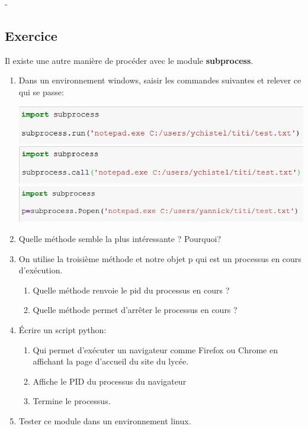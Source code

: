 \documentclass[11pt,a4paper]{article}
\newcounter{numexo}
\begin{document}
-
\addtocounter{numexo}{1}
\subsection*{\Large Exercice \thenumexo}
Il existe une autre manière de procéder avec le module \textbf{subprocess}.

\begin{enumerate}
\item Dans un environnement windows, saisir les commandes suivantes et relever ce qui se passe:
\begin{flushleft}
\includegraphics[scale=0.8]{img/subprocess1.jpg}
\includegraphics[scale=0.8]{img/subprocess2.jpg}
\includegraphics[scale=0.8]{img/subprocess3.jpg}
\end{flushleft}
\item Quelle méthode semble la plus intéressante ? Pourquoi?
\item On utilise la troisième méthode et notre objet p qui est un processus en cours d'exécution. 
\begin{enumerate}
\item Quelle méthode renvoie le pid du processus en cours ?
\item Quelle méthode permet d'arrêter le processus en cours ?
\end{enumerate}
\item Écrire un script python:
\begin{enumerate}
\item Qui permet d'exécuter un navigateur comme Firefox ou Chrome en affichant la page d'accueil du site du lycée.
\item Affiche le PID du processus du navigateur 
\item Termine le processus.
\end{enumerate}
\item Tester ce module dans un environnement linux.
\end{enumerate}
\end{document}
